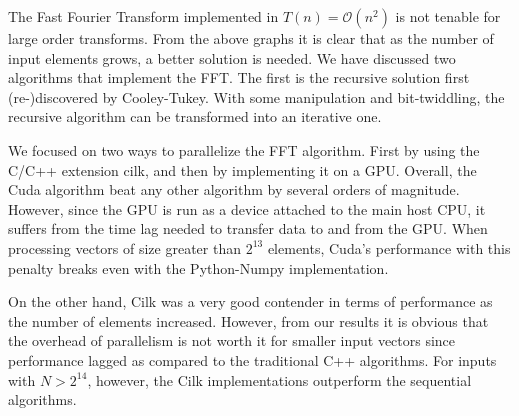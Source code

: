 The Fast Fourier Transform implemented in $T(n) = \mathcal{O}(n^2)$ is not tenable for large order transforms. From the above graphs it is clear that as the number of input elements grows, a better solution is needed. We have discussed two algorithms that implement the FFT. The first is the recursive solution first (re-)discovered by Cooley-Tukey. With some manipulation and bit-twiddling, the recursive algorithm can be transformed into an iterative one.

We focused on two ways to parallelize the FFT algorithm. First by using the C/C++ extension cilk, and then by implementing it on a GPU. Overall, the Cuda algorithm beat any other algorithm by several orders of magnitude. However, since the GPU is run as a device attached to the main host CPU, it suffers from the time lag needed to transfer data to and from the GPU. When processing vectors of size greater than $2^{13}$ elements, Cuda's performance with this penalty breaks even with the Python-Numpy implementation. 

On the other hand, Cilk was a very good contender in terms of performance as the number of elements increased. However, from our results it is obvious that the overhead of parallelism is not worth it for smaller input vectors since performance lagged as compared to the traditional C++ algorithms. For inputs with $N>2^{14}$, however, the Cilk implementations outperform the sequential algorithms. 